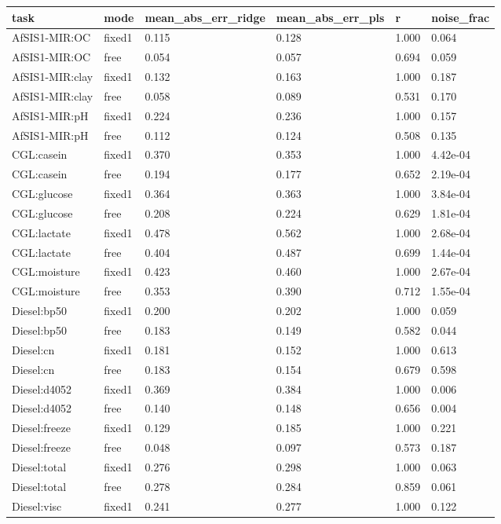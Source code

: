 \begin{tabular}{llllll}
\hline
task & mode & mean\_abs\_err\_ridge & mean\_abs\_err\_pls & r & noise\_frac \\
\hline
AfSIS1-MIR:OC & fixed1 & 0.115 & 0.128 & 1.000 & 0.064 \\
AfSIS1-MIR:OC & free & 0.054 & 0.057 & 0.694 & 0.059 \\
AfSIS1-MIR:clay & fixed1 & 0.132 & 0.163 & 1.000 & 0.187 \\
AfSIS1-MIR:clay & free & 0.058 & 0.089 & 0.531 & 0.170 \\
AfSIS1-MIR:pH & fixed1 & 0.224 & 0.236 & 1.000 & 0.157 \\
AfSIS1-MIR:pH & free & 0.112 & 0.124 & 0.508 & 0.135 \\
CGL:casein & fixed1 & 0.370 & 0.353 & 1.000 & 4.42e-04 \\
CGL:casein & free & 0.194 & 0.177 & 0.652 & 2.19e-04 \\
CGL:glucose & fixed1 & 0.364 & 0.363 & 1.000 & 3.84e-04 \\
CGL:glucose & free & 0.208 & 0.224 & 0.629 & 1.81e-04 \\
CGL:lactate & fixed1 & 0.478 & 0.562 & 1.000 & 2.68e-04 \\
CGL:lactate & free & 0.404 & 0.487 & 0.699 & 1.44e-04 \\
CGL:moisture & fixed1 & 0.423 & 0.460 & 1.000 & 2.67e-04 \\
CGL:moisture & free & 0.353 & 0.390 & 0.712 & 1.55e-04 \\
Diesel:bp50 & fixed1 & 0.200 & 0.202 & 1.000 & 0.059 \\
Diesel:bp50 & free & 0.183 & 0.149 & 0.582 & 0.044 \\
Diesel:cn & fixed1 & 0.181 & 0.152 & 1.000 & 0.613 \\
Diesel:cn & free & 0.183 & 0.154 & 0.679 & 0.598 \\
Diesel:d4052 & fixed1 & 0.369 & 0.384 & 1.000 & 0.006 \\
Diesel:d4052 & free & 0.140 & 0.148 & 0.656 & 0.004 \\
Diesel:freeze & fixed1 & 0.129 & 0.185 & 1.000 & 0.221 \\
Diesel:freeze & free & 0.048 & 0.097 & 0.573 & 0.187 \\
Diesel:total & fixed1 & 0.276 & 0.298 & 1.000 & 0.063 \\
Diesel:total & free & 0.278 & 0.284 & 0.859 & 0.061 \\
Diesel:visc & fixed1 & 0.241 & 0.277 & 1.000 & 0.122 \\

\end{tabular}
